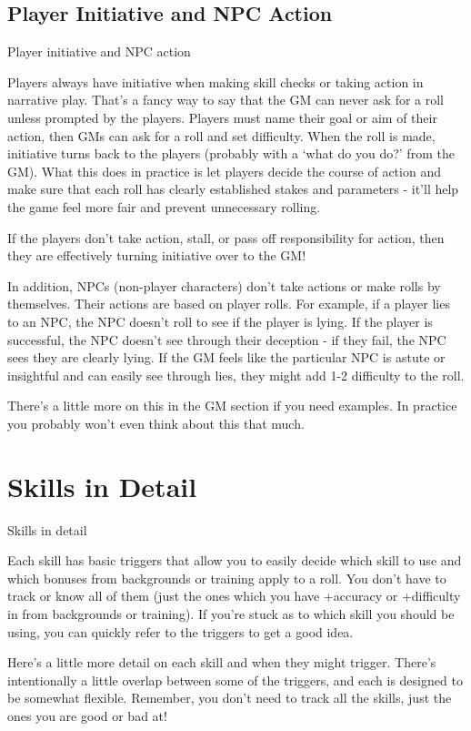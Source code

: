 \subsection{Player Initiative and NPC Action}
                                 Player initiative and NPC action


Players always have initiative when making skill checks or taking action in narrative play. That’s
a fancy way to say that the GM can never ask for a roll unless prompted by the players. Players
must name their goal or aim of their action, then GMs can ask for a roll and set difficulty. When
the roll is made, initiative turns back to the players (probably with a ‘what do you do?’ from the
GM). What this does in practice is let players decide the course of action and make sure that
each roll has clearly established stakes and parameters - it’ll help the game feel more fair and
prevent unnecessary rolling.


If the players don’t take action, stall, or pass off responsibility for action, then they are
effectively turning initiative over to the GM!


In addition, NPCs (non-player characters) don’t take actions or make rolls by themselves. Their
actions are based on player rolls. For example, if a player lies to an NPC, the NPC doesn’t roll to
see if the player is lying. If the player is successful, the NPC doesn’t see through their deception
- if they fail, the NPC sees they are clearly lying. If the GM feels like the particular NPC is astute
or insightful and can easily see through lies, they might add 1-2 difficulty to the roll.


There’s a little more on this in the GM section if you need examples. In practice you probably
won’t even think about this that much.

\section{Skills in Detail}
                                               Skills in detail


Each skill has basic triggers that allow you to easily decide which skill to use and which
bonuses from backgrounds or training apply to a roll. You don’t have to track or know all of
them (just the ones which you have +accuracy or +difficulty in from backgrounds or training). If
you’re stuck as to which skill you should be using, you can quickly refer to the triggers to get a
good idea.


Here’s a little more detail on each skill and when they might trigger. There’s intentionally a little
overlap between some of the triggers, and each is designed to be somewhat flexible.
Remember, you don’t need to track all the skills, just the ones you are good or bad at!


